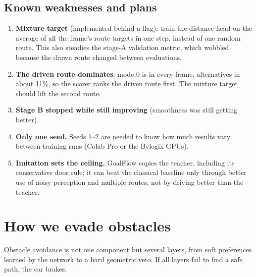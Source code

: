 \documentclass[11pt,a4paper]{article}
\begin{document}
\subsection{Known weaknesses and plans}
\begin{enumerate}[nosep]
  \item \textbf{Mixture target} (implemented behind a flag): train the distance head on the average of all
        the frame's route targets in one step, instead of one random route. This also steadies the stage-A
        validation metric, which wobbled because the drawn route changed between evaluations.
  \item \textbf{The driven route dominates}: mode 0 is in every frame, alternatives in about 11\%, so the
        scorer ranks the driven route first. The mixture target should lift the second route.
  \item \textbf{Stage B stopped while still improving} (smoothness was still getting better).
  \item \textbf{Only one seed.} Seeds 1--2 are needed to know how much results vary between training runs
        (Colab Pro or the Bylogix GPUs).
  \item \textbf{Imitation sets the ceiling.} GoalFlow copies the teacher, including its conservative door
        rule; it can beat the classical baseline only through better use of noisy perception and multiple
        routes, not by driving better than the teacher.
\end{enumerate}

\section{How we evade obstacles}
\label{sec:evade}

Obstacle avoidance is not one component but several layers, from soft preferences learned by the network
to a hard geometric veto. If all layers fail to find a safe path, the car brakes.
\end{document}
